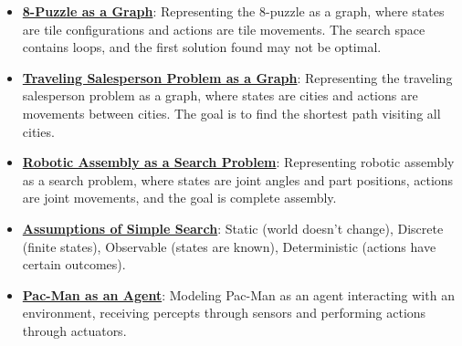 \documentclass{article}%
\begin{document}
\begin{itemize}[leftmargin=*]
\item \href{https://purdue.brightspace.com/d2l/common/assets/pdfjs-d2l-dist/1.0.14-legacy/web/viewer.html?file=\%2Fcontent\%2Fenforced\%2F1095467-wl.202510.CS.24300.001\%2F14L1-DepthFS.pdf\%3Fou\%3D1095467\&lang=en-us\&container=d2l-fileviewer-rendered-pdf\&fullscreen=d2l-fileviewer-rendered-pdf-dialog\&height=667#page=29}{\textbf{8-Puzzle as a Graph}}: Representing the 8-puzzle as a graph, where states are tile configurations and actions are tile movements. The search space contains loops, and the first solution found may not be optimal.%
\item \href{https://purdue.brightspace.com/d2l/common/assets/pdfjs-d2l-dist/1.0.14-legacy/web/viewer.html?file=\%2Fcontent\%2Fenforced\%2F1095467-wl.202510.CS.24300.001\%2F14L1-DepthFS.pdf\%3Fou\%3D1095467\&lang=en-us\&container=d2l-fileviewer-rendered-pdf\&fullscreen=d2l-fileviewer-rendered-pdf-dialog\&height=667#page=32}{\textbf{Traveling Salesperson Problem as a Graph}}: Representing the traveling salesperson problem as a graph, where states are cities and actions are movements between cities. The goal is to find the shortest path visiting all cities.%
\item \href{https://purdue.brightspace.com/d2l/common/assets/pdfjs-d2l-dist/1.0.14-legacy/web/viewer.html?file=\%2Fcontent\%2Fenforced\%2F1095467-wl.202510.CS.24300.001\%2F14L1-DepthFS.pdf\%3Fou\%3D1095467\&lang=en-us\&container=d2l-fileviewer-rendered-pdf\&fullscreen=d2l-fileviewer-rendered-pdf-dialog\&height=667#page=33}{\textbf{Robotic Assembly as a Search Problem}}: Representing robotic assembly as a search problem, where states are joint angles and part positions, actions are joint movements, and the goal is complete assembly.%
\item \href{https://purdue.brightspace.com/d2l/common/assets/pdfjs-d2l-dist/1.0.14-legacy/web/viewer.html?file=\%2Fcontent\%2Fenforced\%2F1095467-wl.202510.CS.24300.001\%2F14L1-DepthFS.pdf\%3Fou\%3D1095467\&lang=en-us\&container=d2l-fileviewer-rendered-pdf\&fullscreen=d2l-fileviewer-rendered-pdf-dialog\&height=667#page=34}{\textbf{Assumptions of Simple Search}}: Static (world doesn't change), Discrete (finite states), Observable (states are known), Deterministic (actions have certain outcomes).%
\item \href{https://purdue.brightspace.com/d2l/common/assets/pdfjs-d2l-dist/1.0.14-legacy/web/viewer.html?file=\%2Fcontent\%2Fenforced\%2F1095467-wl.202510.CS.24300.001\%2F14L1-DepthFS.pdf\%3Fou\%3D1095467\&lang=en-us\&container=d2l-fileviewer-rendered-pdf\&fullscreen=d2l-fileviewer-rendered-pdf-dialog\&height=667#page=35}{\textbf{Pac-Man as an Agent}}: Modeling Pac-Man as an agent interacting with an environment, receiving percepts through sensors and performing actions through actuators.%

\end{itemize}
\end{document}
